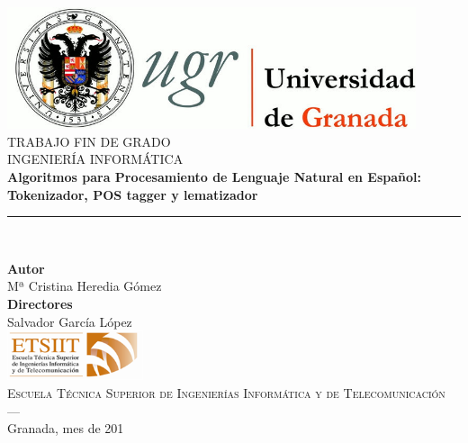 \begin{titlepage}
 
\newlength{\centeroffset}
\setlength{\centeroffset}{-0.5\oddsidemargin}
\addtolength{\centeroffset}{0.5\evensidemargin}
\thispagestyle{empty}

\noindent\hspace*{\centeroffset}%

\centering
\includegraphics[width=0.9\textwidth]{imagenes/logo_ugr.jpg}\\[1.4cm]

\textsc{ \Large TRABAJO FIN DE GRADO\\[0.2cm]}
\textsc{ INGENIERÍA INFORMÁTICA}\\[1cm]
% 
{\huge\bfseries Algoritmos para Procesamiento de Lenguaje Natural en Español: Tokenizador, POS tagger y lematizador \\
}
\noindent\rule[-1ex]{\textwidth}{3pt}\\[3.5ex]

\vspace{1.0cm}
\noindent\hspace*{\centeroffset}%
\centering

\textbf{Autor}\\ {Mª Cristina Heredia Gómez}\\[2.5ex]
\textbf{Directores}\\
{Salvador García López}\\[2cm]
\includegraphics[width=0.3\textwidth]{imagenes/etsiit_logo.png}\\[0.1cm]
\textsc{Escuela Técnica Superior de Ingenierías Informática y de Telecomunicación}\\
\textsc{---}\\
Granada, mes de 201
\end{titlepage}




